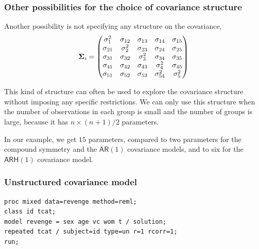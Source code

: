 \documentclass{beamer}
\begin{document}
\begin{frame}[fragile]
\frametitle{Other possibilities for the choice of covariance structure}
\bi
\item Another possibility is not specifying any structure on the covariance,
\[
\boldsymbol {\Sigma}_i=
  \begin{pmatrix}
  \sigma^2_1 & \sigma_{12} & \sigma_{13} & \sigma_{14} & \sigma_{15} \\
   \sigma_{21} & \sigma_2^2  & \sigma_{23} & \sigma_{24} & \sigma_{25}\\
  \sigma_{31} & \sigma_{32} & \sigma^2_3 & \sigma_{34} & \sigma_{35}\\
   \sigma_{41} & \sigma_{42} & \sigma_{43} & \sigma_{4}^2 & \sigma_{45}\\
    \sigma_{51} & \sigma_{52} & \sigma_{53} & \sigma_{54}^2 & \sigma_{5}^2\\
    \end{pmatrix}
\]

\item This kind of structure can often be used to explore the covariance structure without
imposing any specific restrictions. We can only use this structure when the number of observations in each group is small and the number of groups is large, because it has $n \times(n+1)/2$ parameters.
\item In our example, we get $15$ parameters, compared to two parameters for the compound symmetry and the $\mathsf{AR}(1)$ covariance models, and
to six for the  $\mathsf{ARH}(1)$ covariance model. 

\ei
\end{frame}

\begin{frame}[fragile]
\frametitle{Unstructured covariance model}
 
\begin{tcolorbox}[colback=white, colframe=hecblue, title=\SASlang{} code to adjust an unstructure covariance model]
\begin{verbatim}
proc mixed data=revenge method=reml;
class id tcat;
model revenge = sex age vc wom t / solution;
repeated tcat / subject=id type=un r=1 rcorr=1;
run;
\end{verbatim}
\end{tcolorbox}
\end{frame}
\end{document}
